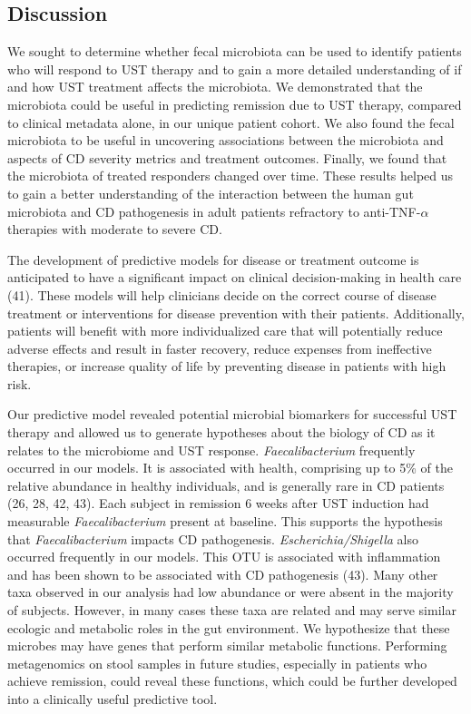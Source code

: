 \documentclass[12pt,]{article}
\begin{document}
\subsection{Discussion}\label{discussion}

We sought to determine whether fecal microbiota can be used to identify
patients who will respond to UST therapy and to gain a more detailed
understanding of if and how UST treatment affects the microbiota. We
demonstrated that the microbiota could be useful in predicting remission
due to UST therapy, compared to clinical metadata alone, in our unique
patient cohort. We also found the fecal microbiota to be useful in
uncovering associations between the microbiota and aspects of CD
severity metrics and treatment outcomes. Finally, we found that the
microbiota of treated responders changed over time. These results helped
us to gain a better understanding of the interaction between the human
gut microbiota and CD pathogenesis in adult patients refractory to
anti-TNF-\({\alpha}\) therapies with moderate to severe CD.

The development of predictive models for disease or treatment outcome is
anticipated to have a significant impact on clinical decision-making in
health care (41). These models will help clinicians decide on the
correct course of disease treatment or interventions for disease
prevention with their patients. Additionally, patients will benefit with
more individualized care that will potentially reduce adverse effects
and result in faster recovery, reduce expenses from ineffective
therapies, or increase quality of life by preventing disease in patients
with high risk.

Our predictive model revealed potential microbial biomarkers for
successful UST therapy and allowed us to generate hypotheses about the
biology of CD as it relates to the microbiome and UST response.
\emph{Faecalibacterium} frequently occurred in our models. It is
associated with health, comprising up to 5\% of the relative abundance
in healthy individuals, and is generally rare in CD patients (26, 28,
42, 43). Each subject in remission 6 weeks after UST induction had
measurable \emph{Faecalibacterium} present at baseline. This supports
the hypothesis that \emph{Faecalibacterium} impacts CD pathogenesis.
\emph{Escherichia/Shigella} also occurred frequently in our models. This
OTU is associated with inflammation and has been shown to be associated
with CD pathogenesis (43). Many other taxa observed in our analysis had
low abundance or were absent in the majority of subjects. However, in
many cases these taxa are related and may serve similar ecologic and
metabolic roles in the gut environment. We hypothesize that these
microbes may have genes that perform similar metabolic functions.
Performing metagenomics on stool samples in future studies, especially
in patients who achieve remission, could reveal these functions, which
could be further developed into a clinically useful predictive tool.
\end{document}
